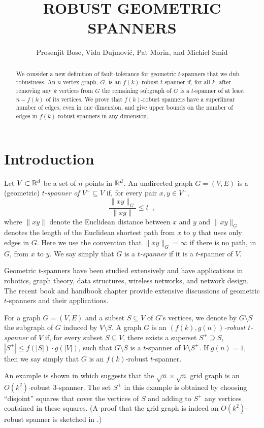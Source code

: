 \documentclass{patmorin}
\title{\MakeUppercase{Robust Geometric Spanners}}
\author{Prosenjit Bose, Vida Dujmovi\'c, Pat Morin, and Michiel Smid}
\begin{document}
\maketitle

\begin{abstract}
  We consider a new definition of fault-tolerance for geometric
  $t$-spanners that we dub robustness.  An $n$ vertex graph, $G$, is
  an $f(k)$-robust $t$-spanner if, for all $k$, after removing any $k$
  vertices from $G$ the remaining subgraph of $G$ is a $t$-spanner
  of at least $n-f(k)$ of its vertices.  We prove that $f(k)$-robust
  spanners have a superlinear number of edges, even in one dimension,
  and give upper bounds on the number of edges in $f(k)$-robust spanners
  in any dimension.
\end{abstract}

\section{Introduction}

Let $V\subset \mathbb{R}^d$ be a set of $n$ points in $\mathbb{R}^d$.  An undirected
graph $G=(V,E)$ is a (geometric) \emph{$t$-spanner of $V^-\subseteq V$} if,
for every pair $x,y\in V^-$,
\[
  \frac{\|xy\|_G}{\|xy\|} \le t \enspace ,
\]
where $\|xy\|$ denote the Euclidean distance between $x$ and $y$ and
$\|xy\|_G$ denotes the length of the Euclidean shortest path from $x$
to $y$ that uses only edges in $G$.  Here we use the convention that
$\|xy\|_G=\infty$ if there is no path, in $G$, from $x$ to $y$.  We say
simply that $G$ is a \emph{$t$-spanner} if it is a $t$-spanner of $V$.

Geometric $t$-spanners have been studied extensively and have applications
in robotics, graph theory, data structures, wireless networks, and
network design.  The recent book \cite{ns07} and handbook chapter
\cite{e99} provide extensive discussions of geometric $t$-spanners and
their applications.

For a graph $G=(V,E)$ and a subset $S\subseteq V$ of $G$'s vertices, we
denote by $G\setminus S$ the subgraph of $G$ induced by $V\setminus S$.
A graph $G$ is an \emph{$(f(k),g(n))$-robust $t$-spanner} of $V$ if, for
every subset $S\subseteq V$, there exists a superset $S^+\supseteq S$,
$|S^+|\le f(|S|)\cdot g(|V|)$, such that $G\setminus S$ is a $t$-spanner
of $V\setminus S^+$.  If $g(n)=1$, then we say simply that $G$ is an
$f(k)$-robust $t$-spanner.

An example is shown in  which suggests that the
$\sqrt{n}\times\sqrt{n}$ grid graph is an $O(k^2)$-robust 3-spanner.
The set $S^+$ in this example is obtained by choosing ``disjoint''
squares that cover the vertices of $S$ and adding to $S^+$ any vertices
contained in these squares.  (A proof that the grid graph is indeed an
$O(k^2)$-robust spanner is sketched in .)
\end{document}
